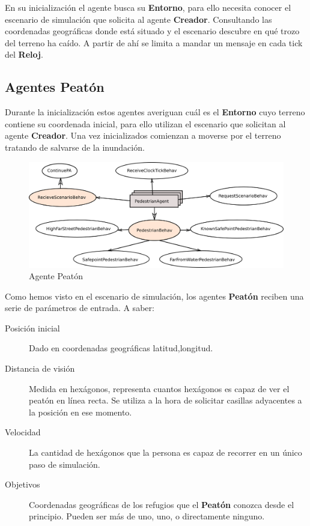 En su inicialización el agente busca su {\bf Entorno}, para ello necesita
conocer el escenario de simulación que solicita al agente {\bf Creador}.
Consultando las coordenadas geográficas donde está situado y el escenario
descubre en qué trozo del terreno ha caído. A partir de ahí se limita a mandar
un mensaje en cada tick del {\bf Reloj}.


\subsection*{Agentes Peatón}

Durante la inicialización estos agentes averiguan cuál es el {\bf Entorno} cuyo
terreno contiene su coordenada inicial, para ello utilizan el escenario que
solicitan al agente {\bf Creador}. Una vez inicializados comienzan a moverse
por el terreno tratando de salvarse de la inundación.

\begin{figure}[H]
 \centering
 \includegraphics[width=130mm]{figuras/cap5/ag_pedestrian.png}
 \caption{Agente Peatón}
\end{figure}

Como hemos visto en el escenario de simulación, los agentes {\bf Peatón}
reciben una serie de parámetros de entrada. A saber:

\begin{description}
 \item[Posición inicial] Dado en coordenadas geográficas latitud,longitud.
 \item[Distancia de visión] Medida en hexágonos, representa cuantos hexágonos
 es capaz de ver el peatón en línea recta. Se utiliza a la hora de solicitar
 casillas adyacentes a la posición en ese momento.
 \item[Velocidad] La cantidad de hexágonos que la persona es capaz de recorrer
 en un único paso de simulación.
 \item[Objetivos] Coordenadas geográficas de los refugios que el {\bf Peatón}
 conozca desde el principio. Pueden ser más de uno, uno, o directamente ninguno.
\end{description}

